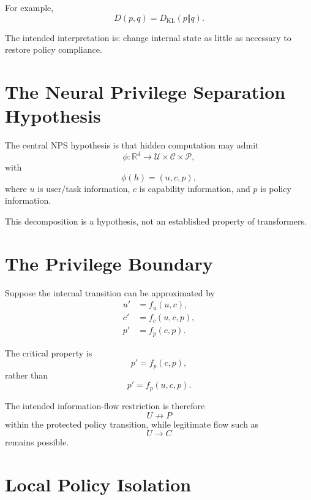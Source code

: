 \documentclass[11pt]{article}
\newcommand{\R}{\mathbb{R}}
\newcommand{\KL}{D_{\mathrm{KL}}}
\begin{document}
For example,
\begin{equation}
D(p,q)=\KL(p\Vert q).
\end{equation}

The intended interpretation is: change internal state as little as
necessary to restore policy compliance.

\section{The Neural Privilege Separation Hypothesis}

The central NPS hypothesis is that hidden computation may admit
\begin{equation}
\phi:\R^d\rightarrow
\mathcal U\times\mathcal C\times\mathcal P,
\end{equation}
with
\begin{equation}
\phi(h)=(u,c,p),
\end{equation}
where $u$ is user/task information, $c$ is capability information, and $p$
is policy information.

This decomposition is a hypothesis, not an established property of
transformers.

\section{The Privilege Boundary}

Suppose the internal transition can be approximated by
\begin{align}
u'&=f_u(u,c),\\
c'&=f_c(u,c,p),\\
p'&=f_p(c,p).
\end{align}

The critical property is
\begin{equation}
p'=f_p(c,p),
\end{equation}
rather than
\begin{equation}
p'=f_p(u,c,p).
\end{equation}

The intended information-flow restriction is therefore
\begin{equation}
U\not\rightarrow P
\end{equation}
within the protected policy transition, while legitimate flow such as
\begin{equation}
U\rightarrow C
\end{equation}
remains possible.

\section{Local Policy Isolation}
\end{document}

